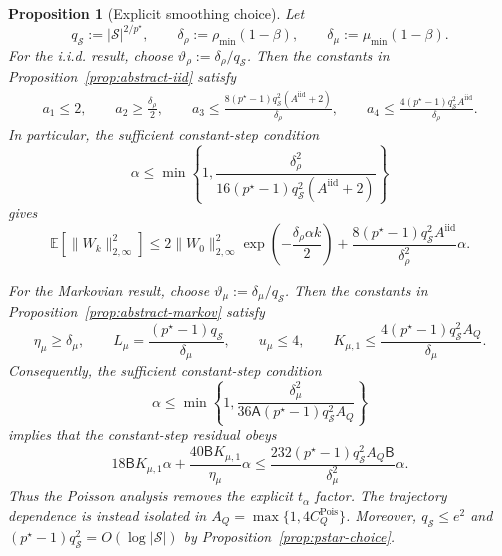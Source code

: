 \documentclass{article}
\newtheorem{proposition}[theorem]{Proposition}
\newcommand{\X}{\mathcal{S}}
\begin{document}
\begin{proposition}[Explicit smoothing choice]
\label{prop:explicit-discounted-constants}
Let
\begin{equation}
q_{\X}:=\lvert\X\rvert^{2/p^\star},\qquad \delta_\rho:=\rho_{\min}(1-\beta),\qquad \delta_\mu:=\mu_{\min}(1-\beta).
\end{equation}
For the i.i.d. result, choose $\vartheta_\rho:=\delta_\rho/q_{\X}$. Then the constants in Proposition~\ref{prop:abstract-iid} satisfy
\begin{equation}
\begin{gathered}
a_1\le2,\qquad a_2\ge\frac{\delta_\rho}{2},\qquad a_3\le\frac{8(p^\star-1)q_{\X}^2(A^{\mathrm{iid}}+2)}{\delta_\rho},\qquad a_4\le\frac{4(p^\star-1)q_{\X}^2A^{\mathrm{iid}}}{\delta_\rho}.
\end{gathered}
\end{equation}
In particular, the sufficient constant-step condition
\begin{equation}
\alpha\le\min\left\{1,\frac{\delta_\rho^2}{16(p^\star-1)q_{\X}^2(A^{\mathrm{iid}}+2)}\right\}
\end{equation}
gives
\begin{equation}
\mathbb E\left[\lVert W_k\rVert_{2,\infty}^2\right]\le2\lVert W_0\rVert_{2,\infty}^2\exp\left(-\frac{\delta_\rho\alpha k}{2}\right)+\frac{8(p^\star-1)q_{\X}^2A^{\mathrm{iid}}}{\delta_\rho^2}\alpha.
\end{equation}

For the Markovian result, choose $\vartheta_\mu:=\delta_\mu/q_{\X}$. Then the constants in Proposition~\ref{prop:abstract-markov} satisfy
\begin{equation}
\eta_\mu\ge\delta_\mu,\qquad L_\mu=\frac{(p^\star-1)q_{\X}}{\delta_\mu},\qquad u_\mu\le4,\qquad
K_{\mu,1}\le\frac{4(p^\star-1)q_{\X}^2A_Q}{\delta_\mu}.
\end{equation}
Consequently, the sufficient constant-step condition
\begin{equation}
\alpha\le\min\left\{1,\frac{\delta_\mu^2}{36\mathsf A(p^\star-1)q_{\X}^2A_Q}\right\}
\end{equation}
implies that the constant-step residual obeys
\begin{equation}
18\mathsf B K_{\mu,1}\alpha+\frac{40\mathsf B K_{\mu,1}}{\eta_\mu}\alpha
\le\frac{232(p^\star-1)q_{\X}^2A_Q\mathsf B}{\delta_\mu^2}\alpha.
\end{equation}
Thus the Poisson analysis removes the explicit $t_\alpha$ factor. The trajectory dependence is instead isolated in $A_Q=\max\{1,4C_Q^{\mathrm{Pois}}\}$. Moreover, $q_{\X}\le e^2$ and $(p^\star-1)q_{\X}^2=O(\log\lvert\X\rvert)$ by Proposition~\ref{prop:pstar-choice}.
\end{proposition}
\end{document}
